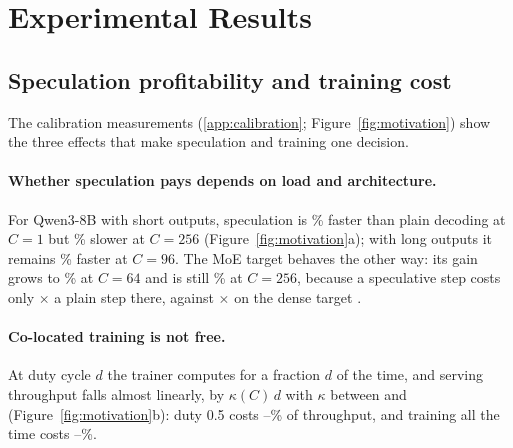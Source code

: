 \section{Experimental Results}\label{sec:evaluation}

\subsection{Speculation profitability and training cost}\label{sec:measure}

The calibration measurements (\cref{app:calibration}; Figure~\ref{fig:motivation}) show the three effects that make speculation and training one decision.

\paragraph{Whether speculation pays depends on load and architecture.} For Qwen3-8B with short outputs, speculation is \% faster than plain decoding at $C{=}1$ but \% slower at $C{=}256$ (Figure~\ref{fig:motivation}a); with long outputs it remains \% faster at $C{=}96$. The MoE target behaves the other way: its gain grows to \% at $C{=}64$ and is still \% at $C{=}256$, because a speculative step costs only $\times$ a plain step there, against $\times$ on the dense target \citep{huang2025moesd}.

\paragraph{Co-located training is not free.} At duty cycle $d$ the trainer computes for a fraction $d$ of the time, and serving throughput falls almost linearly, by $\kappa(C)\,d$ with $\kappa$ between  and  (Figure~\ref{fig:motivation}b): duty 0.5 costs --\% of throughput, and training all the time costs --\%.

